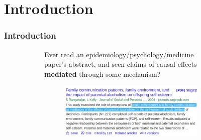 \documentclass[dvipsnames]{beamer} %
\begin{document}
\section{Introduction}
\begin{frame}
    \frametitle{Introduction}
    \begin{figure}[h!]
        \centering
        \singlespacing
        \begin{subfigure}[c]{\textwidth}
            Ever read an epidemiology/psychology/medicine paper's abstract, and seen claims of causal effects \textbf{mediated} through some mechanism?
        \end{subfigure}
        \begin{subfigure}[c]{0.75\textwidth}
            \centering
            \singlespacing
            \begin{subfigure}[c]{\textwidth}
                \centering
                \includegraphics[width=\textwidth]{presentation-files/headlines/rangarajan-2006.png}
            \end{subfigure}
        \end{subfigure}
    \end{figure}
\end{frame}
\end{document}
